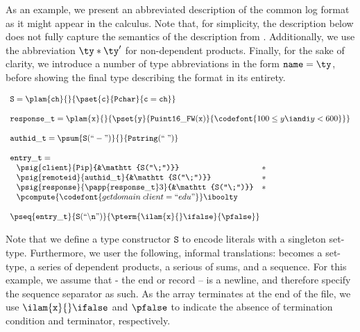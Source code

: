 As an example, we present an abbreviated description of the common log
format as it might appear in the calculus. Note that, for simplicity,
the description below does not fully capture the semantics of the
\ipads{} description from . Additionally, we
use the abbreviation $\ty * \ty'$ for non-dependent products. Finally,
for the sake of clarity, we introduce a number of type abbreviations
in the form $\mathtt{name} = \ty$, before showing the final type
describing the format in its entirety.

\[
\begin{array}{l}
\mathtt{S} = \plam {\mathtt{ch}} {} {\pset {\mathtt{c}}
  {\mathtt{Pchar}} {\mathtt{c = ch}}}\\
\\
\mathtt{response\_t} = \plam {\mathtt x} {} {
      \pset {\mathtt y} {\mathtt{Puint16\_FW(x)}} 
      {\codefont{100 \leq y \iandi y < 600}}
    }\\
\\
\mathtt{authid\_t} = 
\psum {\mathtt{S(``-")}} {} {\mathtt{Pstring(``\;")}}\\
\\
\mathtt{entry\_t} = \\ \;
\begin{array}{lll}
\psig {\mathtt{client}} {\mathtt{Pip}} {&\mathtt{S(``\;")}} &* \\
\psig {\mathtt{remoteid}} {\mathtt{authid\_t}} {&\mathtt{S(``\;")}} &* \\
\psig {\mathtt{response}} {
  \papp
    {\mathtt{response\_t}} 3
}{&\mathtt{S(``\;")}} &*\\
\multicolumn{3}{c}{
\pcompute {\codefont{getdomain\;client = ``edu"}} \iboolty}
\end{array}\\
\\
\pseq {\mathtt{entry\_t}} {\mathtt{S(``\backslash n")}}{
  \pterm {\ilam {\mathtt x} {} \ifalse} {\pfalse}
}
\end{array}
\]

Note that we define a type constructor $\mathtt{S}$ to encode literals
with a singleton set-type. Furthermore, we user the following,
informal translations:\Pwhere{} becomes a set-type, \Pstruct{} a
series of dependent products, \Punion{} a serious of sums, and
\Parray{} a sequence. For this example, we assume that \Peor{} - the
end or record -- is a newline, and therefore specify the sequence
separator as such. As the array terminates at the end of the file, we
use $\ilam {\mathtt x} {} \ifalse$ and $\pfalse$ to indicate the
absence of termination condition and terminator, respectively.

